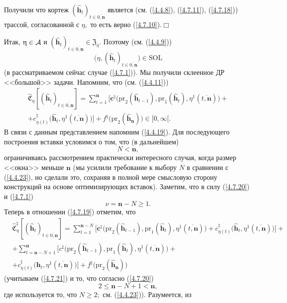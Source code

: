 \documentclass[11pt,twoside,openany]{report}
\newcommand{\bfn}{\begin{equation}}
\newcommand{\efn}{\end{equation}}
\newcommand{\ov}{\overline}
\newcommand{\ca}{{\cal A}}
\newcommand{\zc}{{\mathbf c}}
\newcommand{\nn}{{\mathbf n}}
\begin{document}
{{Получили что кортеж $(\hat{\mathbf{h}}_t)_{t\in\ov{0,\nn}}$ является (см. (\ref{4.4.8}),
(\ref{4.7.11}), (\ref{4.7.18})) трассой, согласованной с $\eta,$ то есть
верно (\ref{4.7.10}).\hfill$\Box$

Итак, $\eta\in\ca$ и $(\hat{\mathbf{h}}_t)_{t\in\ov{0,\nn}}\in \mathfrak{Z}_\eta.$
Поэтому (см. (\ref{4.4.9}))
$$\bigl(\eta,(\hat{\mathbf{h}}_t)_{t\in\ov{0,\nn}}\bigl)\in \mathrm{SOL}
$$
(в рассматриваемом сейчас случае (\ref{4.7.1})). Мы получили склеенное ДР <<большой>>
задачи. Напомним, что (см. (\ref{4.4.11}))
\begin{eqnarray}
&\widehat{\mathfrak{C}}_\eta[(\hat{\mathbf{h}}_t)_{t\in\ov{0,\nn}}] =
\sum\limits_{t=1}^\nn\bigl[
\zc^\natural\bigl(\mathrm{pr}_2(\hat{\mathbf{h}}_{t-1}),\mathrm{pr}_1(\hat{\mathbf{h}}_t),
\eta^1(\ov{t,\nn})\bigl)+
&\nonumber\\
&+c_{\eta(t)}^\natural\bigl(\hat{\mathbf{h}}_t,
\eta^1(\ov{t,\nn})\bigl)\bigl] +f^\natural\bigl(\mathrm{pr}_2(\hat{\mathbf{h}}_\nn)\bigl)\in [0,\infty[.
\label{4.7.19}
\end{eqnarray}
В связи с данным представлением напомним (\ref{4.4.19}). Для последующего построения
вставки условимся о том, что (в дальнейшем)
\bfn\label{4.7.20}N < \nn,
\efn
ограничиваясь рассмотрением практически интересного случая, когда размер <<окна>>
меньше $\nn$ (мы усилили требование к выбору $N$ в сравнении с (\ref{4.4.23}), но
сделали это, сохраняя в полной мере смысловую сторону конструкций на основе
оптимизирующих вставок). Заметим, что в силу (\ref{4.7.20}) и (\ref{4.7.1})
\bfn\label{4.7.21}\nu = \nn-N \geqslant 1.
\efn
Теперь в отношении (\ref{4.7.19}) отметим, что
\begin{eqnarray}
&\widehat{\mathfrak{C}}_\eta^\natural[(\hat{\mathbf{h}}_t)_{t\in\ov{0,\nn}}] =
\sum\limits_{t=1}^{\nn-N}\bigl[
\zc^\natural\bigl(\mathrm{pr}_2(\hat{\mathbf{h}}_{t-1}),\mathrm{pr}_1(\hat{\mathbf{h}}_t),
\eta^1(\ov{t,\nn})\bigl)+ c_{\eta(t)}^\natural\bigl(\hat{\mathbf{h}}_t,\eta^1(\ov{t,\nn})\bigl)\bigl] +
&\nonumber\\
&+ \sum\limits_{t=\nn-N+1}^\nn\bigl[
c^\natural\bigl(\mathrm{pr}_2(\hat{\mathbf{h}}_{t-1}),\mathrm{pr}_1(\hat{\mathbf{h}}_t),
\eta^1(\ov{t,\nn})\bigl)+
&\nonumber\\
&+c_{\eta(t)}^\natural\bigl(\hat{\mathbf{h}}_t,\eta^1(\ov{t,\nn})\bigl)\bigl]
+f^\natural\bigl(\mathrm{pr}_2(\hat{\mathbf{h}}_\nn)\bigl)
&\label{4.7.22}
\end{eqnarray}
(учитываем (\ref{4.7.21}) и то, что согласно (\ref{4.7.20})
$$2 \leqslant \nn -N + 1 < \nn,
$$
где используется то, что $N \geqslant 2;$ см. (\ref{4.4.23})). Разумеется, из
}}
\end{document}
